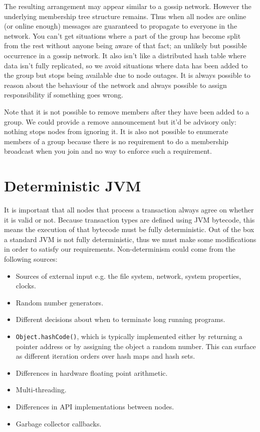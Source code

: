 \documentclass{article}
\begin{document}
The resulting arrangement may appear similar to a gossip network. However the underlying membership tree structure
remains. Thus when all nodes are online (or online enough) messages are guaranteed to propagate to everyone in the
network. You can't get situations where a part of the group has become split from the rest without anyone being aware of
that fact; an unlikely but possible occurrence in a gossip network. It also isn't like a distributed hash table where
data isn't fully replicated, so we avoid situations where data has been added to the group but stops being available due
to node outages. It is always possible to reason about the behaviour of the network and always possible to assign
responsibility if something goes wrong.

Note that it is not possible to remove members after they have been added to a group. We could provide a remove
announcement but it'd be advisory only: nothing stops nodes from ignoring it. It is also not possible to enumerate
members of a group because there is no requirement to do a membership broadcast when you join and no way to enforce such
a requirement.


\section{Deterministic JVM}

It is important that all nodes that process a transaction always agree on whether it is valid or not. Because
transaction types are defined using JVM bytecode, this means the execution of that bytecode must be fully
deterministic. Out of the box a standard JVM is not fully deterministic, thus we must make some modifications
in order to satisfy our requirements. Non-determinism could come from the following sources:

\begin{itemize}
\item Sources of external input e.g. the file system, network, system properties, clocks.
\item Random number generators.
\item Different decisions about when to terminate long running programs.
\item \texttt{Object.hashCode()}, which is typically implemented either by returning a pointer address or by
assigning the object a random number. This can surface as different iteration orders over hash maps and hash sets.
\item Differences in hardware floating point arithmetic.
\item Multi-threading.
\item Differences in API implementations between nodes.
\item Garbage collector callbacks.
\end{itemize}
\end{document}
